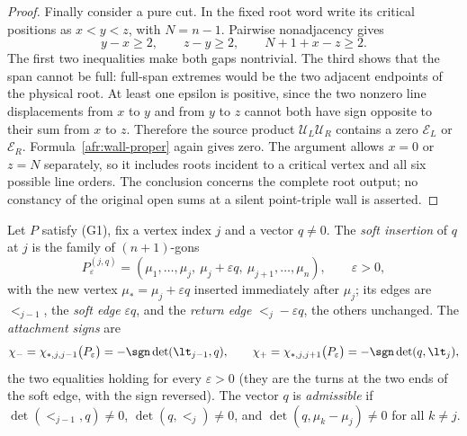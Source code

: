 \begin{proof}
Finally consider a pure cut. In the fixed root word write its critical
positions as $x<y<z$, with $N=n-1$. Pairwise nonadjacency gives
\begin{equation}\label{as7:pure-gaps}
y-x\geq2,\qquad z-y\geq2,\qquad N+1+x-z\geq2.
\end{equation}
The first two inequalities make both gaps nontrivial. The third shows
that the span cannot be full: full-span extremes would be the two
adjacent endpoints of the physical root. At least one epsilon is
positive, since the two nonzero line displacements from $x$ to $y$
and from $y$ to $z$ cannot both have sign opposite to their sum from
$x$ to $z$. Therefore the source product
$\mathcal U_L\mathcal U_R$ contains a zero $\mathcal E_L$ or
$\mathcal E_R$. Formula~\eqref{afr:wall-proper} again gives zero.
The argument allows $x=0$ or $z=N$ separately, so it includes roots
incident to a critical vertex and all six possible line orders.
The conclusion concerns the complete root output; no constancy of
the original open sums at a silent point-triple wall is asserted.
\end{proof}

\begin{definition}\label{def:soft}\leanok
Let $P$ satisfy (G1), fix a vertex index $j$ and a vector $q\neq0$. The
\emph{soft insertion} of $q$ at $j$ is the family of $(n+1)$-gons
\[
P^{(j,q)}_\varepsilon=(\mu_1,\ldots,\mu_j,\ \mu_j+\varepsilon q,\ \mu_{j+1},\ldots,\mu_n),
\qquad\varepsilon>0,
\]
with the new vertex $\mu_*=\mu_j+\varepsilon q$ inserted immediately after
$\mu_j$; its edges are $\lt_{j-1}$, the \emph{soft edge} $\varepsilon q$, and
the \emph{return edge} $\lt_j-\varepsilon q$, the others unchanged. The
\emph{attachment signs} are
\[
\chi_-=\chi_{*,j,j-1}\bigl(P_\varepsilon\bigr)=-\sgn\det(\lt_{j-1},q),\qquad
\chi_+=\chi_{*,j,j+1}\bigl(P_\varepsilon\bigr)=-\sgn\det(q,\lt_j),
\]
the two equalities holding for every $\varepsilon>0$ (they are the turns at
the two ends of the soft edge, with the sign reversed). The vector $q$ is
\emph{admissible} if $\det(\lt_{j-1},q)\neq0$, $\det(q,\lt_j)\neq0$, and
$\det(q,\mu_k-\mu_j)\neq0$ for all $k\neq j$.
\end{definition}

